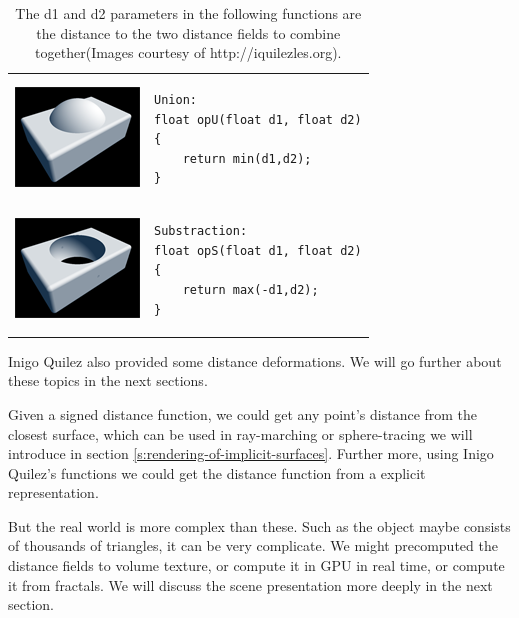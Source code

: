 \begin{table}
\begin{tabular}{m{3cm}m{}} 
\includegraphics{graphics/df/union} &
	 \begin{lstlisting}
Union:
float opU(float d1, float d2)
{
    return min(d1,d2);
}
\end{lstlisting} \\
   \includegraphics{graphics/df/substraction} & 
    \begin{lstlisting}
Substraction:
float opS(float d1, float d2)
{
    return max(-d1,d2);
}
   \end{lstlisting}
\end{tabular}
\caption{The d1 and d2 parameters in the following functions are the distance to the two distance fields to combine together(Images courtesy of http://iquilezles.org).}
\end{table}

Inigo Quilez also provided some distance deformations. We will go further about these topics in the next sections. 

Given a signed distance function, we could get any point's distance from the closest surface, which can be used in ray-marching or sphere-tracing we will introduce in section \ref{s:rendering-of-implicit-surfaces}. Further more, using Inigo Quilez's functions we could get the distance function from a explicit representation.  

But the real world is more complex than these. Such as the object maybe consists of thousands of triangles, it can be very complicate. We might precomputed the distance fields to volume texture, or compute it in GPU in real time, or compute it from fractals. We will discuss the scene presentation more deeply in the next section.  

